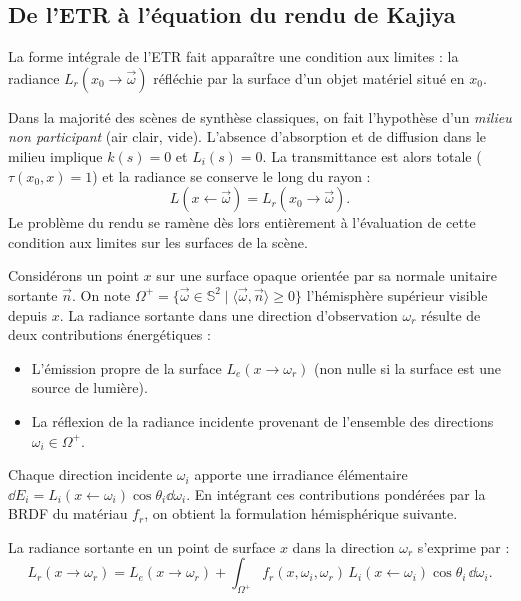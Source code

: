 \subsection{De l'ETR à l'équation du rendu de Kajiya}

La forme intégrale de l'ETR fait apparaître une condition aux limites : la radiance $L_r(x_0 \to \vec{\omega})$ réfléchie par la surface d'un objet matériel situé en $x_0$. 

Dans la majorité des scènes de synthèse classiques, on fait l'hypothèse d'un \emph{milieu non participant} (air clair, vide). L'absence d'absorption et de diffusion dans le milieu implique $k(s) = 0$ et $L_i(s) = 0$. La transmittance est alors totale ($\tau(x_0, x) = 1$) et la radiance se conserve le long du rayon :
\begin{equation}
    L(x \leftarrow \vec{\omega}) = L_r(x_0 \to \vec{\omega}).
\end{equation}
Le problème du rendu se ramène dès lors entièrement à l'évaluation de cette condition aux limites sur les surfaces de la scène.

\begin{proposition}
    Considérons un point $x$ sur une surface opaque orientée par sa normale unitaire sortante $\vec{n}$. On note $\Omega^+ = \{ \vec{\omega} \in \mathbb{S}^2 \mid \langle \vec{\omega}, \vec{n} \rangle \geqslant 0 \}$ l'hémisphère supérieur visible depuis $x$.
    La radiance sortante dans une direction d'observation $\omega_r$ résulte de deux contributions énergétiques :
    \begin{itemize}
        \item L'émission propre de la surface $L_e(x \to \omega_r)$ (non nulle si la surface est une source de lumière).
        \item La réflexion de la radiance incidente provenant de l'ensemble des directions $\omega_i \in \Omega^+$.
    \end{itemize}
    Chaque direction incidente $\omega_i$ apporte une irradiance élémentaire $\dd E_i = L_i(x \leftarrow \omega_i) \cos\theta_i \dd\omega_i$. En intégrant ces contributions pondérées par la BRDF du matériau $f_r$, on obtient la formulation hémisphérique suivante. 
\end{proposition}

\begin{theorem}
    La radiance sortante en un point de surface $x$ dans la direction $\omega_r$ s'exprime par :
    \begin{equation}
        L_r(x \to \omega_r) = L_e(x \to \omega_r) + \int_{\Omega^+} f_r(x, \omega_i, \omega_r) \, L_i(x \leftarrow \omega_i) \cos\theta_i \, \dd\omega_i.
    \end{equation}
\end{theorem}

